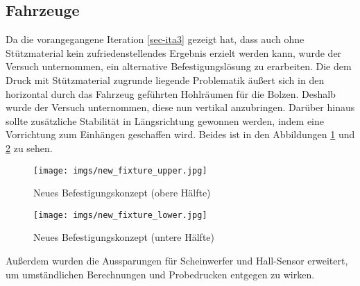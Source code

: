 \documentclass[.../Dokumentation.tex]{subfiles}
\begin{document}
\subsection{Fahrzeuge}\label{sec-ita4-cars}
Da die vorangegangene Iteration \ref{sec-ita3} gezeigt hat, dass auch ohne 
Stützmaterial kein zufriedenstellendes Ergebnis erzielt werden kann, 
wurde der Versuch unternommen, ein alternative Befestigungslösung zu erarbeiten. 
Die dem Druck mit Stützmaterial zugrunde liegende Problematik äußert sich in 
den horizontal durch das Fahrzeug geführten Hohlräumen für die Bolzen.
Deshalb wurde der Versuch unternommen, diese nun vertikal anzubringen.
Darüber hinaus sollte zusätzliche Stabilität in Längsrichtung gewonnen werden, 
indem eine Vorrichtung zum \grqq Einhängen\grqq{} geschaffen wird. 
Beides ist in den Abbildungen \ref{fig-new-fixture-upper} und 
\ref{fig-new-fixture-lower} zu sehen.
\begin{figure}[H]
\begin{center}
    \texttt{[image: imgs/new\_fixture\_upper.jpg]}
    \caption{Neues Befestigungskonzept (obere Hälfte)}
    \label{fig-new-fixture-upper}
\end{center}
\end{figure}
\noindent
\begin{figure}[H]
\begin{center}
    \texttt{[image: imgs/new\_fixture\_lower.jpg]}
    \caption{Neues Befestigungskonzept (untere Hälfte)}
    \label{fig-new-fixture-lower}
\end{center}
\end{figure}
\noindent 
Außerdem wurden die Aussparungen für Scheinwerfer und Hall-Sensor erweitert, 
um umständlichen Berechnungen und Probedrucken entgegen zu wirken.
\end{document}
